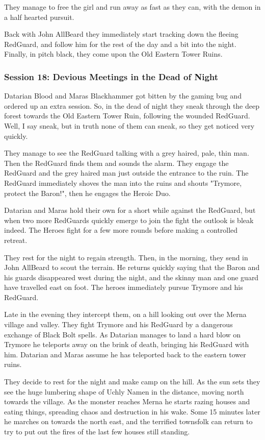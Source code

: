 They manage to free the girl and run away as fast as they can, with the demon in a half hearted pursuit.

Back with John AllBeard they immediately start tracking down the fleeing RedGuard, and follow him for the rest of the day and a bit into the night. Finally, in pitch black, they come upon the Old Eastern Tower Ruins.


\subsubsection*{Session 18: Devious Meetings in the Dead of Night}
Datarian Blood and Maras Blackhammer got bitten by the gaming bug and ordered up an extra session. So, in the dead of night they sneak through the deep forest towards the Old Eastern Tower Ruin, following the wounded RedGuard. Well, I say sneak, but in truth none of them can sneak, so they get noticed very quickly.

They manage to see the RedGuard talking with a grey haired, pale, thin man. Then the RedGuard finds them and sounds the alarm. They engage the RedGuard and the grey haired man just outside the entrance to the ruin. The RedGuard immediately shoves the man into the ruins and shouts "Trymore, protect the Baron!", then he engages the Heroic Duo.

Datarian and Maras hold their own for a short while against the RedGuard, but when two more RedGuards quickly emerge to join the fight the outlook is bleak indeed. The Heroes fight for a few more rounds before making a controlled retreat.

They rest for the night to regain strength. Then, in the morning, they send in John AllBeard to scout the terrain. He returns quickly saying that the Baron and his guards disappeared west during the night, and the skinny man and one guard have travelled east on foot. The heroes immediately pursue Trymore and his RedGuard.

Late in the evening they intercept them, on a hill looking out over the Merna village and valley. They fight Trymore and his RedGuard by a dangerous exchange of Black Bolt spells. As Datarian manages to land a hard blow on Trymore he teleports away on the brink of death, bringing his RedGuard with him.
Datarian and Maras assume he has teleported back to the eastern tower ruins.

They decide to rest for the night and make camp on the hill. As the sun sets they see the huge lumbering shape of Uchly Namen in the distance, moving north towards the village.
As the monster reaches Merna he starts razing houses and eating things, spreading chaos and destruction in his wake. Some 15 minutes later he marches on towards the north east, and the terrified townsfolk can return to try to put out the fires of the last few houses still standing.


